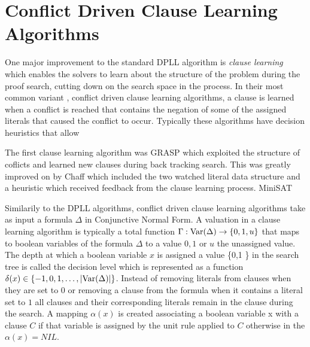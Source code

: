 \section{Conflict Driven Clause Learning Algorithms}
One major improvement to the standard DPLL algorithm is \emph{clause learning} which enables the solvers to learn about the structure of the problem during the proof search, cutting down on the search space in the process. In their most common variant , conflict driven clause learning algorithms, a clause is learned when a conflict is reached that contains the negation of some of the assigned literals that caused the conflict to occur. Typically these algorithms have decision heuristics that allow

The first clause learning algorithm was GRASP \cite{MS99,MS96} which exploited the structure of coflicts and learned new clauses during back tracking search. This was greatly improved on by Chaff \cite{LZ01} which included the two watched literal data structure and a heuristic which received feedback from the clause learning process. MiniSAT

Similarily to the DPLL algorithms, conflict driven clause learning algorithms take as input a formula $\Delta$ in Conjunctive Normal Form. 
A valuation in a clause learning algorithm is typically a total function $\Gamma : \mathrm{Var}(\Delta) \to \{0,1,u\}$ that maps to boolean variables of the formula $\Delta$ to a value $0,1$ or $u$ the unassigned value. The depth at which a boolean variable $x$ is assigned a value \{0,1 \} in the search tree is called the decision level which is represented as a function $\delta(x) \in \{-1,0,1, \ldots, |\mathrm{Var}(\Delta)| \} $. Instead of removing literals from clauses when they are set to $0$ or removing a clause from the formula when it contains a literal set to $1$ all clauses and their corresponding literals remain in the clause during the search. A mapping $\alpha(x)$ is created associating a boolean variable x with a clause $C$ if that variable is assigned by the unit rule applied to $C$ otherwise in the $\alpha(x) = NIL$.

